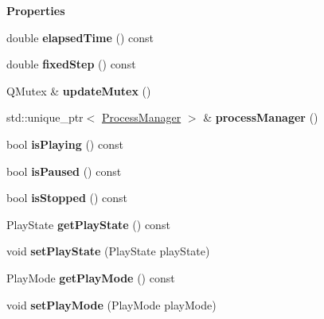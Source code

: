 \begin{Indent}\textbf{ Properties}\par
\begin{DoxyCompactItemize}
\item 
\mbox{\label{classrev_1_1_simulation_loop_ac4108655a137163a511b76fc23bc5a60}} 
double {\bfseries elapsed\+Time} () const
\item 
\mbox{\label{classrev_1_1_simulation_loop_a018b7dca1f7caf8ecccfa7c6791bf786}} 
double {\bfseries fixed\+Step} () const
\item 
\mbox{\label{classrev_1_1_simulation_loop_abe5349983c46e815444bbb20e6f42f58}} 
Q\+Mutex \& {\bfseries update\+Mutex} ()
\item 
\mbox{\label{classrev_1_1_simulation_loop_aa5efdf9bb8227f9f860aff3e2aadb065}} 
std\+::unique\+\_\+ptr$<$ \mbox{\hyperlink{classrev_1_1_process_manager}{Process\+Manager}} $>$ \& {\bfseries process\+Manager} ()
\item 
\mbox{\label{classrev_1_1_simulation_loop_ac387fed3fa28b48ef30627db2a573022}} 
bool {\bfseries is\+Playing} () const
\item 
\mbox{\label{classrev_1_1_simulation_loop_a4363d198bffc56553b299e22573fe203}} 
bool {\bfseries is\+Paused} () const
\item 
\mbox{\label{classrev_1_1_simulation_loop_aec6479b7f19f1812c27d3873c872a843}} 
bool {\bfseries is\+Stopped} () const
\item 
\mbox{\label{classrev_1_1_simulation_loop_a48abb0b6c65ce5355440dbb1a83e6b91}} 
Play\+State {\bfseries get\+Play\+State} () const
\item 
\mbox{\label{classrev_1_1_simulation_loop_a0e16c3e16d5bd6eb3a394584d53c59a4}} 
void {\bfseries set\+Play\+State} (Play\+State play\+State)
\item 
\mbox{\label{classrev_1_1_simulation_loop_a5828ec483ff0245839cd02475ed45c6e}} 
Play\+Mode {\bfseries get\+Play\+Mode} () const
\item 
\mbox{\label{classrev_1_1_simulation_loop_a8b86a6775a4a70a97d1332bc91899c0a}} 
void {\bfseries set\+Play\+Mode} (Play\+Mode play\+Mode)
\end{DoxyCompactItemize}
\end{Indent}
